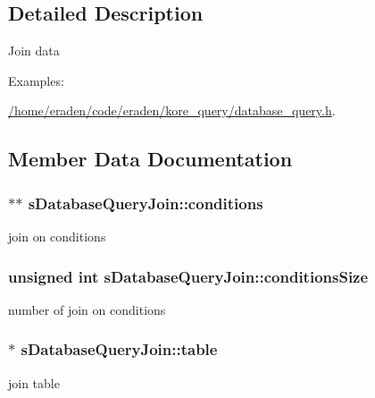 \subsection{Detailed Description}
Join data \begin{Desc}
\item[Examples\+: ]\par
\hyperlink{_2home_2eraden_2code_2eraden_2kore_query_2database_query_8h-example}{/home/eraden/code/eraden/kore\+\_\+query/database\+\_\+query.\+h}.\end{Desc}


\subsection{Member Data Documentation}
\subsubsection[{\texorpdfstring{conditions}{conditions}}]{$\ast$$\ast$ s\+Database\+Query\+Join\+::conditions}\hypertarget{structsDatabaseQueryJoin_a0c9a74a0b86f72c5b70caae49d39fd05}{}\label{structsDatabaseQueryJoin_a0c9a74a0b86f72c5b70caae49d39fd05}
join {\ttfamily on} conditions 
\subsubsection[{\texorpdfstring{conditions\+Size}{conditionsSize}}]{\setlength{\rightskip}{0pt plus 5cm}unsigned int s\+Database\+Query\+Join\+::conditions\+Size}\hypertarget{structsDatabaseQueryJoin_a5e0ea926de3b76b97479d26be2f5d935}{}\label{structsDatabaseQueryJoin_a5e0ea926de3b76b97479d26be2f5d935}
number of join {\ttfamily on} conditions 
\subsubsection[{\texorpdfstring{table}{table}}]{$\ast$ s\+Database\+Query\+Join\+::table}\hypertarget{structsDatabaseQueryJoin_acbf5a41cfc09cd83a76141f6c9062917}{}\label{structsDatabaseQueryJoin_acbf5a41cfc09cd83a76141f6c9062917}
join table 
